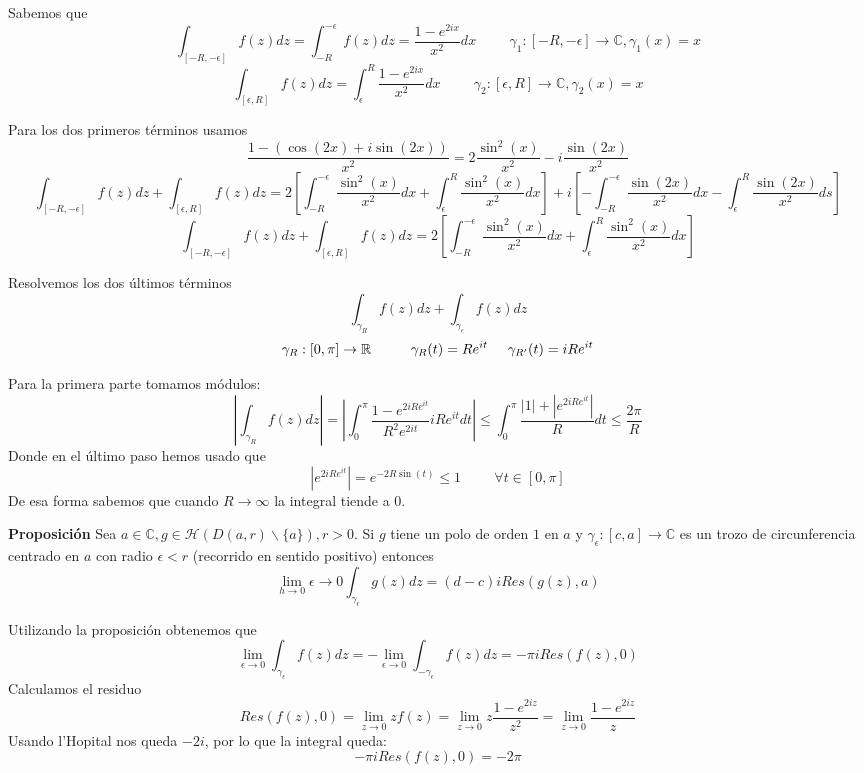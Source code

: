 Sabemos que
$$\int_{[-R,-\epsilon]}f(z)dz = \int_{-R}^{-\epsilon}f(z)dz =  \frac{1-e^{2ix}}{x^2}dx
\hspace{1cm}\gamma_1 : [-R,-\epsilon] \rightarrow\mathbb{C}, \gamma_1(x)=x$$
$$\int_{[\epsilon,R]} f(z)dz = \int_{\epsilon}^{R} \frac{1-e^{2ix}}{x^2}dx
\hspace{1cm}\gamma_2:[\epsilon,R]\rightarrow\mathbb{C}, \gamma_2(x)=x$$

Para los dos primeros términos usamos
$$\frac{1-(\cos(2x)+i\sin(2x))}{x^2} = 2\frac{\sin^2(x)}{x^2}-i\frac{\sin(2x)}{x^2}$$
$$\int_{[-R,-\epsilon]} f(z)dz + \int_{[\epsilon,R]} f(z)dz = 2\left[ \int_{-R}^{-\epsilon} \frac{\sin^2(x)}{x^2}dx + \int_{\epsilon}^{R} \frac{\sin^2(x)}{x^2}dx \right] + i\left[ -\int_{-R}^{-\epsilon}\frac{\sin(2x)}{x^2}dx - \int_{\epsilon}^{R}\frac{\sin(2x)}{x^2}ds \right]$$
$$ \int_{[-R,-\epsilon]} f(z)dz + \int_{[\epsilon,R]} f(z)dz = 2\left[ \int_{-R}^{-\epsilon} \frac{\sin^2(x)}{x^2}dx + \int_{\epsilon}^{R} \frac{\sin^2(x)}{x^2}dx \right]$$

Resolvemos los dos últimos términos
$$ \int_{\gamma_R} f(z)dz + \int_{\gamma_{\epsilon}} f(z)dz $$
$$ \gamma_R : [0,\pi] \rightarrow\mathbb{R}\hspace{1cm} \gamma_R (t)=Re^{it}\hspace{0.5cm}\gamma_{R'}(t) = iRe^{it} $$

Para la primera parte tomamos módulos:
$$ \left| \int_{\gamma_R} f(z)dz \right| = \left| \int_0^{\pi} \frac{1-e^{2iRe^{it}}}{R^2e^{2it}} iRe^{it} dt \right| \leq \int_{0}^{\pi} \frac{|1|+|e^{2iRe^{it}}|}{R}dt \leq \frac{2\pi}{R} $$
Donde en el último paso hemos usado que
$$ |e^{2iRe^{it}}| = e^{-2R\sin(t)} \leq 1 \hspace{1cm} \forall t\in[0,\pi] $$
De esa forma sabemos que cuando $R\rightarrow\infty$ la integral tiende a $0$.


	\textbf{Proposición}
	Sea $a\in\mathbb{C}, g\in\mathcal{H}(D(a,r)\backslash\{a\}), r>0$. Si $g$ tiene un polo de orden $1$ en $a$ y $\gamma_{\epsilon} : [c,a] \rightarrow\mathbb{C}$ es un trozo de circunferencia centrado en $a$ con radio $\epsilon<r$ (recorrido en sentido positivo) entonces
	$$ \lim_{h\rightarrow 0}\epsilon\rightarrow 0 \int_{\gamma_{\epsilon}} g(z)dz = (d-c)iRes(g(z),a) $$

Utilizando la proposición obtenemos que
$$ \lim_{\epsilon\rightarrow 0} \int_{\gamma_{\epsilon}} f(z)dz = -\lim_{\epsilon\rightarrow 0} \int_{-\gamma_{\epsilon}} f(z)dz = -\pi iRes(f(z),0) $$
Calculamos el residuo
$$ Res(f(z),0) = \lim_{z\rightarrow 0} zf(z) = \lim_{z\rightarrow 0} z \frac{1-e^{2iz}}{z^2} =  \lim_{z\rightarrow 0} \frac{1-e^{2iz}}{z} $$
Usando l'Hopital nos queda $-2i$, por lo que la integral queda:
$$ -\pi iRes(f(z),0) = -2\pi $$

